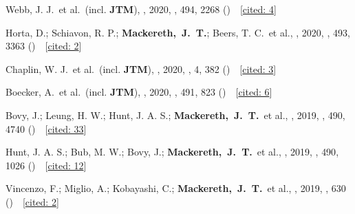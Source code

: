 \item[{\scriptsize11}]Webb, J. J.~et al.~(incl. \textbf{JTM}), , 2020, \mnras, {494}, 2268 ()~~{\footnotesize[\href{http://adsabs.harvard.edu/abs/2020MNRAS.494.2268W}{cited: 4}]}

\item[{\scriptsize10}]Horta, D.; Schiavon, R. P.; \textbf{Mackereth,~J.~T.}; Beers, T. C.~et al., , 2020, \mnras, {493}, 3363 ()~~{\footnotesize[\href{http://adsabs.harvard.edu/abs/2020MNRAS.493.3363H}{cited: 2}]}

\item[{\scriptsize9}]Chaplin, W. J.~et al.~(incl. \textbf{JTM}), , 2020, \natureast, {4}, 382 ()~~{\footnotesize[\href{http://adsabs.harvard.edu/abs/2020NatAs...4..382C}{cited: 3}]}

\item[{\scriptsize8}]Boecker, A.~et al.~(incl. \textbf{JTM}), , 2020, \mnras, {491}, 823 ()~~{\footnotesize[\href{http://adsabs.harvard.edu/abs/2020MNRAS.491..823B}{cited: 6}]}

\item[{\scriptsize7}]Bovy, J.; Leung, H. W.; Hunt, J. A. S.; \textbf{Mackereth,~J.~T.}~et al., , 2019, \mnras, {490}, 4740 ()~~{\footnotesize[\href{http://adsabs.harvard.edu/abs/2019MNRAS.490.4740B}{cited: 33}]}

\item[{\scriptsize6}]Hunt, J. A. S.; Bub, M. W.; Bovy, J.; \textbf{Mackereth,~J.~T.}~et al., , 2019, \mnras, {490}, 1026 ()~~{\footnotesize[\href{http://adsabs.harvard.edu/abs/2019MNRAS.490.1026H}{cited: 12}]}

\item[{\scriptsize5}]Vincenzo, F.; Miglio, A.; Kobayashi, C.; \textbf{Mackereth,~J.~T.}~et al., , 2019, \aanda, {630} ()~~{\footnotesize[\href{http://adsabs.harvard.edu/abs/2019A&A...630A.125V}{cited: 2}]}

